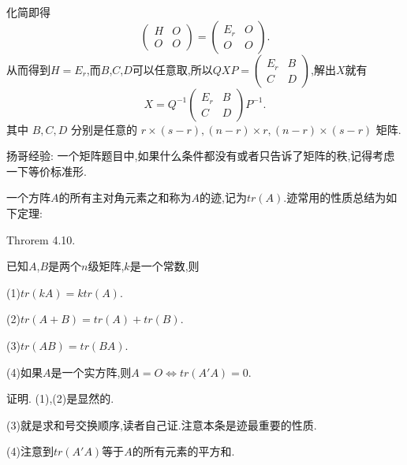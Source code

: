 \documentclass{article}
\begin{document}
化简即得
\begin{equation*}
    \left(\begin{array}{ll}
        H & O \\
        O & O
    \end{array}\right)=\left(\begin{array}{cc}
        E_{r} & O \\
        O     & O
    \end{array}\right).
\end{equation*}
从而得到$H = E_r$,而$B$,$C$,$D$可以任意取,所以$Q X P = \left(
    \begin{array}{cc}
            E_r & B \\
            C   & D
        \end{array}
    \right)$,解出$X$就有
\begin{equation*}
    X=Q^{-1}\left(\begin{array}{cc}
            E_{r} & B \\
            C     & D
        \end{array}\right) P^{-1}.
\end{equation*}
其中 $B, C, D$ 分别是任意的 $r \times(s-r),(n-r) \times r,(n-r) \times(s-r)$ 矩阵.

\vspace{1ex}
{\heiti 扬哥经验: 一个矩阵题目中,如果什么条件都没有或者只告诉了矩阵的秩,记得考虑一下等价标准形.}

\vspace{2ex}
\vspace{2ex}

一个方阵$A$的所有主对角元素之和称为$A$的迹,记为$t r \left(A\right)$.迹常用的性质总结为如下定理:

{\heiti Throrem 4.10.}
{\kaishu 已知$A$,$B$是两个$n$级矩阵,$k$是一个常数,则

(1)$tr \left(kA\right) =ktr \left(A\right)$.

(2)$tr \left(A + B\right) = tr \left(A\right) + tr \left(B\right)$.

(3)$tr \left(AB\right) = tr \left(BA\right)$.

(4)如果$A$是一个实方阵,则$A = O \Longleftrightarrow tr \left(A'A\right) = 0$.}

\vspace{1ex}
{\heiti 证明.} (1),(2)是显然的.

(3)就是求和号交换顺序,读者自己证.注意本条是迹最重要的性质.

(4)注意到$tr \left(A'A\right)$等于$A$的所有元素的平方和.
\end{document}
